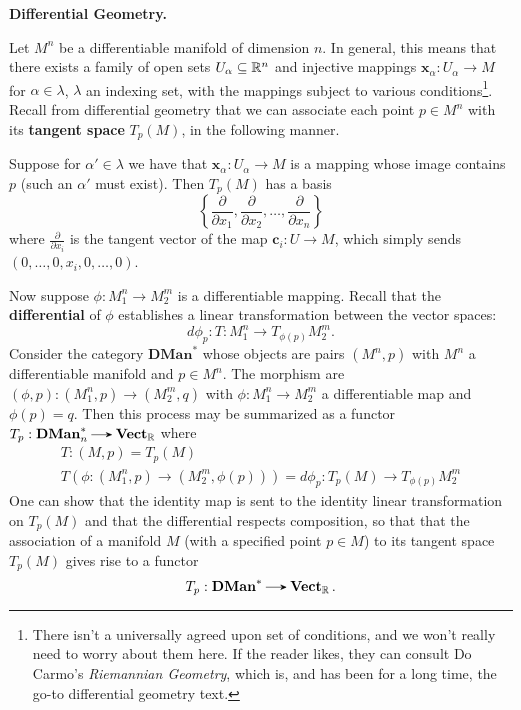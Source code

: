     {\large\noindent \textbf{Differential Geometry.}\par}
    \begin{example}
        Let $M^n$ be a differentiable manifold of dimension $n$. In general, this 
        means that there exists
        a family of open sets $U_\alpha \subseteq \mathbb{R}^n$ and injective 
        mappings $\bm{x}_\alpha: U_\alpha \to M$ for $\alpha \in \lambda$, $\lambda$ an indexing 
        set, with the mappings subject to various conditions\footnote{There isn't 
        a universally agreed upon set of conditions, and we won't really need to worry about 
        them here. If the reader likes, they can consult Do Carmo's \emph{Riemannian Geometry}, 
        which is, and has been for a long time, the go-to differential geometry text.
        }. 
        Recall from differential 
        geometry that we can associate each point $p \in M^n$ with its \textbf{tangent space}
        $T_p(M)$, in the following manner. 
        
        Suppose for $\alpha' \in \lambda$ we have that 
        $\bm{x}_{\alpha}: U_{\alpha} \to M$ is a mapping whose image contains $p$ (such an $\alpha'$ must exist).
        Then $T_p(M)$ has a basis 
        \[
            \left\{ \frac{\partial}{\partial x_1}, \frac{\partial}{\partial x_2}, \dots, \frac{\partial}{\partial x_n} \right\}
        \]
        where $\displaystyle \frac{\partial}{\partial x_i}$ is the tangent vector of the map 
        $\bm{c}_i: U \to M$, which simply sends $(0, \dots ,0, x_i, 0, \dots, 0)$. 

        Now suppose $\phi: M_1^n \to M_2^m$ is a differentiable mapping. Recall 
        that the \textbf{differential} of $\phi$ establishes a 
        linear transformation between the vector spaces: 
        \[
            d\phi_p: T: M^n_1 \to T_{\phi(p)}M^m_2.
        \]  
        Consider the category $\textbf{DMan}^*$
        whose objects are pairs $(M^n, p)$ with $M^n$ a differentiable manifold and 
        $p \in M^n$. The morphism are 
        $(\phi, p): (M_1^n,p) \to (M_2^m, q)$ with $\phi: M_1^n \to M_2^m$ a differentiable 
        map and $\phi(p) = q$. 
        Then this process may be summarized as a functor 
        $T_p: \textbf{DMan}_n^* \to \vect_{\rr}$ where 
        \begin{gather*}
            T:(M, p) = T_p(M)\\
            T(\phi: (M_1^n,p) \to (M_2^m, \phi(p)) ) 
            = d\phi_{p}: T_p(M) \to T_{\phi(p)}M_2^m
        \end{gather*}
        One can show that the identity map is sent to the identity linear transformation 
        on $T_p(M)$ and that the differential respects composition, so that 
        that the association of a manifold $M$ (with a specified point $p \in M$) 
        to its tangent space $T_p(M)$ gives rise to a functor
        \[
            T_p: \textbf{DMan}^* \to \vect_{\rr}.
        \]
    \end{example}\label{example:manifold_tangent_planeone}

